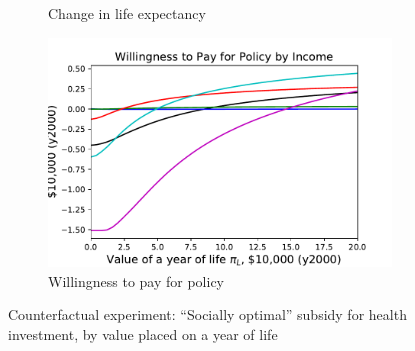 \documentclass[12pt,pdftex,letterpaper]{article}
\begin{document}
\begin{figure}[h!]
\begin{subfigure}[b]{0.49\textwidth}
        \caption{Change in life expectancy}
    \end{subfigure}
    \begin{subfigure}[b]{0.49\textwidth}
        \centering
        \includegraphics[width=\textwidth]{../Figures/SocOptByLifePriceWTP.pdf}
        \caption{Willingness to pay for policy}
    \end{subfigure}
    \caption{Counterfactual experiment: ``Socially optimal'' subsidy for health investment, by value placed on a year of life}
    \label{fig:SocOptByLifePrice}
\end{figure}


\clearpage
\end{document}
